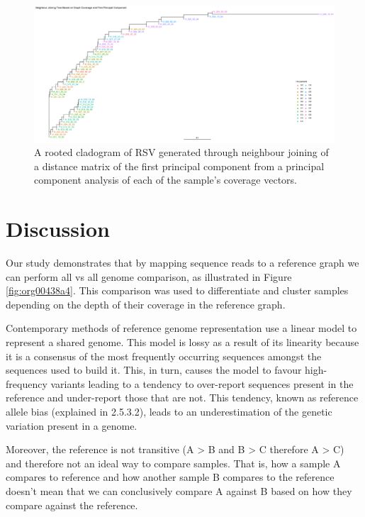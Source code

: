 \documentclass[10pt, a4paper]{article}
\begin{document}
\begin{landscape}
\begin{figure}
\centering
\includegraphics[width=.9\linewidth]{../Figures/RSV/HH20_first_principal_component_nj_tree.png}
\caption[RSV PC1 to PC5 cladogram]{\label{fig:orga9c618e}
A rooted cladogram of RSV generated through neighbour joining of a distance matrix of the first principal component from a principal component analysis of each of the sample’s coverage vectors.}
\end{figure}
\end{landscape}
\newpage
\section{Discussion}
\label{sec:orgd1a0b5d}
Our study demonstrates that by mapping sequence reads to a reference
graph we can perform all vs all genome comparison, as illustrated in 
Figure \ref{fig:org00438a4}.
This comparison was used to differentiate and cluster samples depending on the
depth of their coverage in the reference graph.


Contemporary methods of reference genome representation use a linear model to
represent a shared genome. This model is lossy as a result of its linearity
because it is a consensus of the most frequently occurring sequences amongst 
the sequences used to build it. This, in turn, causes the model to favour 
high-frequency variants leading to a tendency to over-report sequences present 
in the reference and under-report those that are not. This tendency, known as
reference allele bias (explained in 2.5.3.2), leads to an underestimation of 
the genetic variation present in a genome. 

Moreover, the reference is not transitive  (A > B and B > C therefore A > C) 
and therefore not an ideal way to compare samples.
That is, how a sample A compares to reference and how another sample B compares
to the reference doesn't mean that we can conclusively compare A against B based
on how they compare against the reference.
\end{document}
